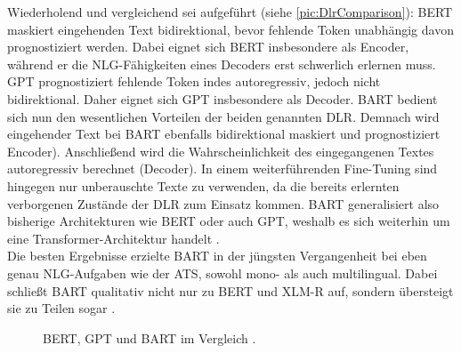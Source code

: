 \noindent
Wiederholend und vergleichend sei aufgeführt (siehe \autoref{pic:DlrComparison}): \ac{BERT} maskiert eingehenden Text bidirektional, bevor fehlende Token unabhängig davon prognostiziert werden. Dabei eignet sich \ac{BERT} insbesondere als Encoder, während er die \ac{NLG}-Fähigkeiten eines Decoders erst schwerlich erlernen muss. \ac{GPT} prognostiziert fehlende Token indes autoregressiv, jedoch nicht bidirektional. Daher eignet sich \ac{GPT} insbesondere als Decoder. \ac{BART} bedient sich nun den wesentlichen Vorteilen der beiden genannten \ac{DLR}. Demnach wird eingehender Text bei \ac{BART} ebenfalls bidirektional maskiert und prognostiziert Encoder). Anschließend wird die Wahrscheinlichkeit des eingegangenen Textes autoregressiv berechnet (Decoder). In einem weiterführenden Fine-Tuning sind hingegen nur unberauschte Texte zu verwenden, da die bereits erlernten verborgenen Zustände der \ac{DLR} zum Einsatz kommen. \ac{BART} generalisiert also bisherige Architekturen wie \ac{BERT} oder auch \ac{GPT}, weshalb es sich weiterhin um eine Transformer-Architektur handelt \cite[S.~2-3]{LEW19}.\\

\noindent
Die besten Ergebnisse erzielte \ac{BART} in der jüngsten Vergangenheit bei eben genau \ac{NLG}-Aufgaben wie der \ac{ATS}, sowohl mono- als auch multilingual. Dabei schließt \ac{BART} qualitativ nicht nur zu \ac{BERT} und \ac{XLM-R} auf, sondern übersteigt sie zu Teilen sogar \cite{LEW19}.
\newpage

\begin{figure}[h!]
  \centering
  \caption{BERT, GPT und BART im Vergleich \cite[S.~2]{LEW19}.}
  \label{pic:DlrComparison}
\end{figure}


